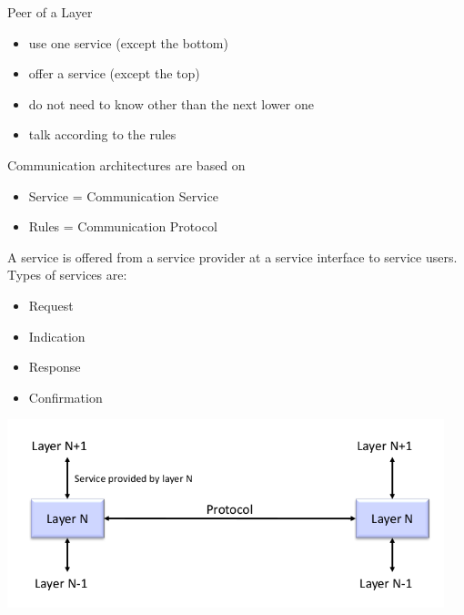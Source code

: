 \documentclass[11pt,ngerman]{article}
\begin{document}
Peer	of	a	Layer
\begin{itemize}
\item
use	one	service	
(except	the	bottom)
\item
offer	a	service	
(except	the	top)
\item
do	not	need	to	know	other	
than	the	next	lower	one
\item
talk	according	to	the	rules
\end{itemize}

Communication	architectures	are	based	on
\begin{itemize}
\item  Service	=	Communication	Service
\item Rules	=	Communication	Protocol

\end{itemize}
A	service	is	offered	from	a	service	provider at	a	service	interface	
to	service	users.\\
Types	of	services	are:
\begin{itemize}
\item Request
\item Indication
\item Response
\item Confirmation
\end{itemize}

\includegraphics[width=5in]{images/Selection_007.png}\\
\end{document}
